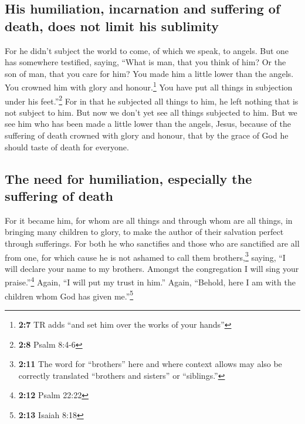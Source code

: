 \hypertarget{his-humiliation-incarnation-and-suffering-of-death-does-not-limit-his-sublimity}{%
\subsection{His humiliation, incarnation and suffering of death, does
not limit his
sublimity}\label{his-humiliation-incarnation-and-suffering-of-death-does-not-limit-his-sublimity}}

 For he didn't subject the world to come, of which we
speak, to angels.  But one has somewhere testified,
saying, ``What is man, that you think of him? Or the son of man, that
you care for him?  You made him a little lower than the
angels. You crowned him with glory and honour.\footnote{\textbf{2:7} TR
  adds ``and set him over the works of your hands''}  You
have put all things in subjection under his feet.''\footnote{\textbf{2:8}
  Psalm 8:4-6} For in that he subjected all things to him, he left
nothing that is not subject to him. But now we don't yet see all things
subjected to him.  But we see him who has been made a
little lower than the angels, Jesus, because of the suffering of death
crowned with glory and honour, that by the grace of God he should taste
of death for everyone.

\hypertarget{the-need-for-humiliation-especially-the-suffering-of-death}{%
\subsection{The need for humiliation, especially the suffering of
death}\label{the-need-for-humiliation-especially-the-suffering-of-death}}

 For it became him, for whom are all things and through
whom are all things, in bringing many children to glory, to make the
author of their salvation perfect through sufferings. 
For both he who sanctifies and those who are sanctified are all from
one, for which cause he is not ashamed to call them brothers,\footnote{\textbf{2:11}
  The word for ``brothers'' here and where context allows may also be
  correctly translated ``brothers and sisters'' or ``siblings.''}
 saying, ``I will declare your name to my brothers.
Amongst the congregation I will sing your praise.''\footnote{\textbf{2:12}
  Psalm 22:22}  Again, ``I will put my trust in him.''
Again, ``Behold, here I am with the children whom God has given
me.''\footnote{\textbf{2:13} Isaiah 8:18}


